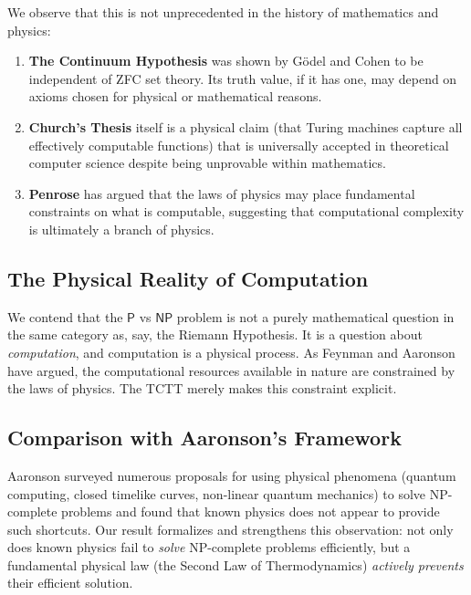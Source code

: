\documentclass[12pt, a4paper]{article}
\theoremstyle{plain}
\theoremstyle{definition}
\theoremstyle{remark}
\newcommand{\Pc}{\mathsf{P}}
\newcommand{\NPc}{\mathsf{NP}}
\begin{document}
We observe that this is not unprecedented in the history of mathematics
and physics:
\begin{enumerate}[label=(\alph*)]
  \item \textbf{The Continuum Hypothesis} was shown by G\"odel and Cohen to
    be independent of ZFC set theory. Its truth value, if it has one, may
    depend on axioms chosen for physical or mathematical reasons.
  \item \textbf{Church's Thesis} itself is a physical claim
    (that Turing machines capture all effectively computable functions)
    that is universally accepted in theoretical computer science despite
    being unprovable within mathematics.
  \item \textbf{Penrose} \citep{Penrose1989, Penrose2004} has argued that
    the laws of physics may place fundamental constraints on what
    is computable, suggesting that computational complexity is
    ultimately a branch of physics.
\end{enumerate}

\subsection{The Physical Reality of Computation}

We contend that the $\Pc$ vs $\NPc$ problem is not a purely mathematical
question in the same category as, say, the Riemann Hypothesis. It is a
question about \emph{computation}, and computation is a physical process.
As Feynman \citep{Feynman1982} and Aaronson \citep{Aaronson2005} have
argued, the computational resources available in nature are constrained
by the laws of physics. The TCTT merely makes this constraint explicit.

\subsection{Comparison with Aaronson's Framework}

Aaronson \citep{Aaronson2005} surveyed numerous proposals for using
physical phenomena (quantum computing, closed timelike curves, non-linear
quantum mechanics) to solve NP-complete problems and found that known
physics does not appear to provide such shortcuts. Our result formalizes
and strengthens this observation: not only does known physics fail to
\emph{solve} NP-complete problems efficiently, but a fundamental physical
law (the Second Law of Thermodynamics) \emph{actively prevents} their
efficient solution.
\end{document}

